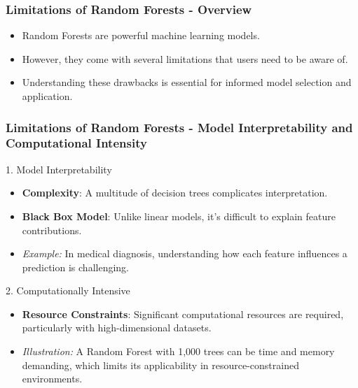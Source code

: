 \documentclass[aspectratio=169]{beamer}
\begin{document}
\begin{frame}[fragile]
  \frametitle{Limitations of Random Forests - Overview}
  \begin{itemize}
    \item Random Forests are powerful machine learning models.
    \item However, they come with several limitations that users need to be aware of.
    \item Understanding these drawbacks is essential for informed model selection and application.
  \end{itemize}
\end{frame}

\begin{frame}[fragile]
  \frametitle{Limitations of Random Forests - Model Interpretability and Computational Intensity}
  \begin{block}{1. Model Interpretability}
    \begin{itemize}
      \item \textbf{Complexity}: A multitude of decision trees complicates interpretation.
      \item \textbf{Black Box Model}: Unlike linear models, it's difficult to explain feature contributions.
      \item \textit{Example:} In medical diagnosis, understanding how each feature influences a prediction is challenging.
    \end{itemize}
  \end{block}
  
  \begin{block}{2. Computationally Intensive}
    \begin{itemize}
      \item \textbf{Resource Constraints}: Significant computational resources are required, particularly with high-dimensional datasets.
      \item \textit{Illustration:} A Random Forest with 1,000 trees can be time and memory demanding, which limits its applicability in resource-constrained environments.
    \end{itemize}
  \end{block}
\end{frame}
\end{document}
